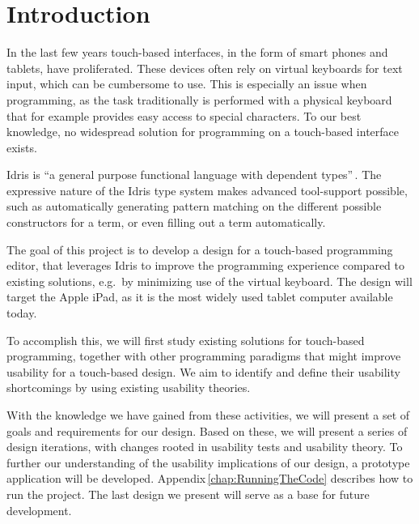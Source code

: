 \chapter{Introduction}
\label{sec:Introduction}
In the last few years touch-based interfaces, in the form of smart phones and tablets, have proliferated. These devices often rely on virtual keyboards for text input, which can be cumbersome to use.
This is especially an issue when programming, as the task traditionally is performed with a physical keyboard
that for example provides easy access to special characters.
To our best knowledge, no widespread solution for programming on a touch-based interface exists.

Idris is ``a general purpose functional language with dependent types''\,\cite{brady2013idris}. The expressive nature of the Idris type system makes advanced tool-support possible, such as automatically generating pattern matching on the different possible constructors for a term, or even filling out a term automatically.

The goal of this project is to develop a design for a touch-based programming editor, that leverages Idris to improve the programming experience compared to existing solutions, e.g.\ by minimizing use of the virtual keyboard.
The design will target the Apple iPad, as it is the most widely used tablet computer available today.

To accomplish this, we will first study existing solutions for touch-based programming, together with other programming paradigms that might improve usability for a touch-based design.
We aim to identify and define their usability shortcomings by using existing usability theories.

With the knowledge we have gained from these activities, we will present a set of goals and requirements for our design.
Based on these, we will present a series of design iterations, with changes rooted in usability tests and usability theory.
To further our understanding of the usability implications of our design, a prototype application will be developed.
Appendix\,\ref{chap:RunningTheCode} describes how to run the project.
The last design we present will serve as a base for future development.

